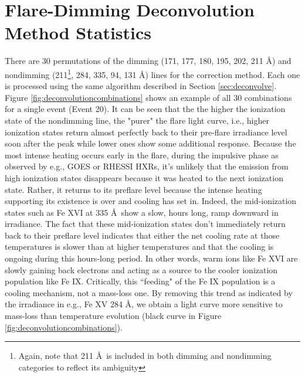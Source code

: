 \section{Flare-Dimming Deconvolution Method Statistics}
\label{sec:deconvolutionstatistics}
There are 30 permutations of the dimming (171, 177, 180, 195, 202, 211 \AA) and nondimming (211\footnote{Again, note that 211 \AA\ is included in both dimming and nondimming categories to reflect its ambiguity}, 284, 335, 94, 131 \AA) lines for the correction method. Each one is processed using the same algorithm described in Section \ref{sec:deconvolve}. Figure \ref{fig:deconvolutioncombinations} shows an example of all 30 combinations for a single event (Event 20). It can be seen that the the higher the ionization state of the nondimming line, the "purer" the flare light curve, i.e., higher ionization states return almost perfectly back to their pre-flare irradiance level soon after the peak while lower ones show some additional response. Because the most intense heating occurs early in the flare, during the impulsive phase as observed by e.g., GOES or RHESSI HXRs, it's unlikely that the emission from high ionization states disappears because it was heated to the next ionization state. Rather, it returns to its preflare level because the intense heating supporting its existence is over and cooling has set in. Indeed, the mid-ionization states such as Fe XVI at 335 \AA\ show a slow, hours long, ramp downward in irradiance. The fact that these mid-ionization states don't immediately return back to their preflare level indicates that either the net cooling rate at those temperatures is slower than at higher temperatures and that the cooling is ongoing during this hours-long period. In other words, warm ions like Fe XVI are slowly gaining back electrons and acting as a source to the cooler ionization population like Fe IX. Critically, this ``feeding" of the Fe IX population is a cooling mechanism, not a mass-loss one. By removing this trend as indicated by the irradiance in e.g., Fe XV 284 \AA, we obtain a light curve more sensitive to mass-loss than temperature evolution (black curve in Figure \ref{fig:deconvolutioncombinations}). 

